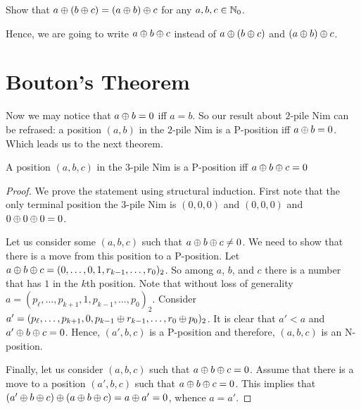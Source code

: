 \begin{exercise}
  Show that $a \oplus (b \oplus c) = (a \oplus b) \oplus c$
  for any $a, b, c \in \mathbb{N}_0$.
\end{exercise}
Hence, we are going to write $a \oplus b \oplus c$ instead of
$a \oplus (b \oplus c)$ and $(a \oplus b) \oplus c$.

\section{Bouton's Theorem}

Now we may notice that $a \oplus b = 0$ iff $a = b$. So
our result about $2$-pile Nim can be refrased:
a position $(a, b)$ in the $2$-pile Nim is a P-position iff
$a \oplus b = 0$. Which leads us to the next theorem.
\begin{theorem}
  A position $(a, b, c)$ in the $3$-pile Nim is a P-position iff
  $a \oplus b \oplus c = 0$
\end{theorem}
\begin{proof}
  We prove the statement using structural induction.
  First note that the only terminal position the $3$-pile Nim is $(0, 0, 0)$
  and $(0, 0, 0)$ and $0 \oplus 0 \oplus 0 = 0$.

  Let us consider
  some $(a, b, c)$ such that $a \oplus b \oplus c \neq 0$.
  We need to show that there is a move from this position to a P-position.
  Let $a \oplus b \oplus c =
      (0, \dots, 0, 1, r_{k - 1}, \dots, r_0)_2$. So among $a$, $b$, and $c$
  there is a number that has $1$ in the $k$th position.
  Note that without loss of generality
  $a = (p_\ell, \dots, p_{k + 1}, 1, p_{k - 1}, \dots, p_0)_2$.
  Consider $a' = (p_\ell, \dots, p_{k + 1}, 0,
    p_{k - 1} \oplus r_{k - 1}, \dots, r_0 \oplus p_0)_2$. It is clear that
  $a' < a$ and $a' \oplus b \oplus c = 0$.
  Hence, $(a', b, c)$ is a P-position and therefore, $(a, b, c)$ is an
  N-position.

  Finally, let us consider $(a, b, c)$ such that
  $a \oplus b \oplus c = 0$. Assume that there is a move to a
  position $(a', b, c)$ such that $a \oplus b \oplus c = 0$.
  This implies that
  $(a' \oplus b \oplus c) \oplus
      (a \oplus b \oplus c) =  a \oplus a' = 0$, whence $a = a'$.
\end{proof}
